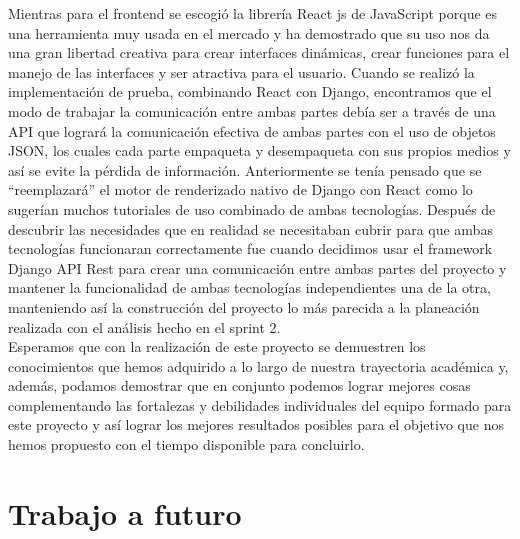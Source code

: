 Mientras para el frontend se escogió la librería React js de JavaScript porque es una herramienta muy usada en el mercado y ha demostrado que su uso nos da una gran libertad creativa para crear interfaces dinámicas, crear funciones para el manejo de las interfaces y ser atractiva para el usuario. Cuando se realizó la implementación de prueba, combinando React con Django, encontramos que el modo de trabajar la comunicación entre ambas partes debía ser a través de una API que logrará la comunicación efectiva de ambas partes con el uso de objetos JSON, los cuales cada parte empaqueta y desempaqueta con sus propios medios y así se evite la pérdida de información. Anteriormente se tenía pensado que se “reemplazará” el motor de renderizado nativo de Django con React como lo sugerían muchos tutoriales de uso combinado de ambas tecnologías. Después de descubrir las necesidades que en realidad se necesitaban cubrir para que ambas tecnologías funcionaran correctamente fue cuando decidimos usar el framework Django API Rest para crear una comunicación entre ambas partes del proyecto y mantener la funcionalidad de ambas tecnologías independientes una de la otra, manteniendo así la construcción del proyecto lo más parecida a la planeación realizada con el análisis hecho en el sprint 2.\\
\newline
 Esperamos que con la realización de este proyecto se demuestren los conocimientos que hemos adquirido a lo largo de nuestra trayectoria académica y, además, podamos demostrar que en conjunto podemos lograr mejores cosas complementando las fortalezas y debilidades individuales del equipo formado para este proyecto y así lograr los mejores resultados posibles para el objetivo que nos hemos propuesto con el tiempo disponible para concluirlo.



\section{Trabajo a futuro} 



